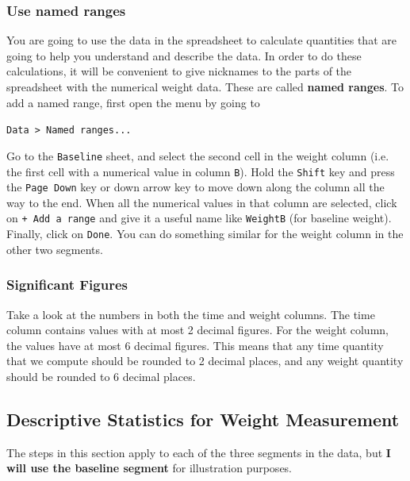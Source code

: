\subsubsection{Use named ranges}
You are going to use the data in the spreadsheet to calculate quantities that are going to help you understand and describe the data. In order to do these calculations, it will be convenient to give nicknames to the parts of the spreadsheet with the numerical weight data. These are called \textbf{named ranges}. To add a named range, first open the menu by going to
\begin{center}
    \texttt{Data > Named ranges...}
\end{center}
Go to the \texttt{Baseline} sheet, and select the second cell in the weight column (i.e. the first cell with a numerical value in column \texttt{B}). Hold the \texttt{Shift} key and press the \texttt{Page Down} key or down arrow key to move down along the column all the way to the end. When all the numerical values in that column are selected, click on \texttt{+ Add a range} and give it a useful name like \texttt{WeightB} (for baseline weight). Finally, click on \texttt{Done}. You can do something similar for the weight column in the other two segments.
\subsubsection{Significant Figures}
Take a look at the numbers in both the time and weight columns. The time column contains values with at most 2 decimal figures. For the weight column, the values have at most 6 decimal figures. This means that any time quantity that we compute should be rounded to 2 decimal places, and any weight quantity should be rounded to 6 decimal places.
\subsection{Descriptive Statistics for Weight Measurement}
The steps in this section apply to each of the three segments in the data, but \textbf{I will use the baseline segment} for illustration purposes.
